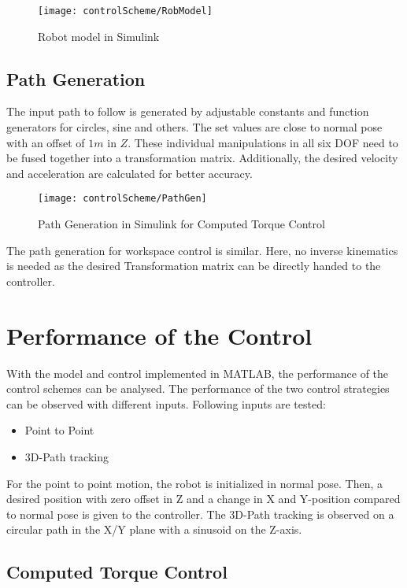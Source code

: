 \begin{figure}[H]
	\texttt{[image: controlScheme/RobModel]}
	\caption{Robot model in Simulink}
	\label{fig:RobModel}
\end{figure}

\subsection{Path Generation}
The input path to follow is generated by adjustable constants and function generators for circles, sine and others. 
The set values are close to normal pose with an offset of $1m$ in $Z$.
These individual manipulations in all six \ac{DOF} need to be fused together into a transformation matrix. 
Additionally, the desired velocity and acceleration are calculated for better accuracy. 

\begin{figure}[H]
	\texttt{[image: controlScheme/PathGen]}
	\caption{Path Generation in Simulink for Computed Torque Control}
	\label{fig:PathGen}
\end{figure}

The path generation for workspace control is similar. Here, no inverse kinematics is needed as the desired Transformation matrix can be directly handed to the controller. 

\section{Performance of the Control}

With the model and control implemented in MATLAB, the performance of the control schemes can be analysed.
The performance of the two control strategies can be observed with different inputs.
Following inputs are tested:
\begin{itemize}
	\item Point to Point
	\item 3D-Path tracking
\end{itemize}
For the point to point motion, the robot is initialized in normal pose. Then, a desired position with zero offset in Z and a change in X and Y-position compared to normal pose is given to the controller.
The 3D-Path tracking is observed on a circular path in the X/Y plane with a sinusoid on the Z-axis.


\subsection{Computed Torque Control}

